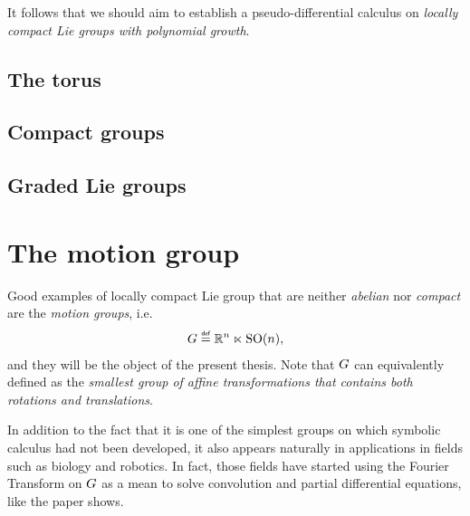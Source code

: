 It follows that we should aim to establish a pseudo-differential calculus on \emph{locally compact Lie groups with polynomial growth}.

\subsection{The torus}

\subsection{Compact groups}

\subsection{Graded Lie groups}

\section{The motion group}

Good examples of locally compact Lie group that are neither \emph{abelian} nor \emph{compact} are the \emph{motion groups}, i.e.
\begin{align*}
    \Group \defeq \R^n \ltimes \SpecialOrthogonalGroup n,
\end{align*}
and they will be the object of the present thesis.
Note that $G$ can equivalently defined as the \emph{smallest group of affine transformations that contains both rotations and translations}.

In addition to the fact that it is one of the simplest groups on which symbolic calculus had not been developed,
it also appears naturally in applications in fields such as biology and robotics.
In fact, those fields have started using the Fourier Transform on $G$ as a mean to solve convolution and partial differential equations,
like the paper \cite{ChirikjianKyatkin00} shows.
